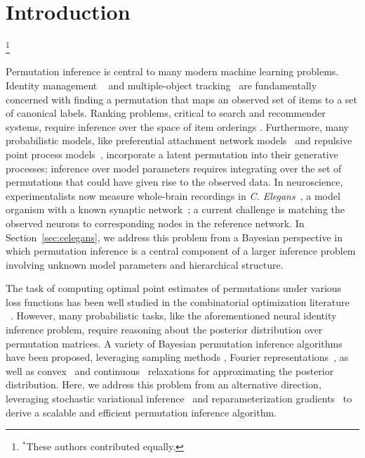 \documentclass[twoside]{article}
\begin{document}
\section{Introduction}
{\let\thefootnote\relax\footnote{$^*$These authors contributed equally.}}

Permutation inference is central to many modern machine learning
problems.  Identity management ~\citep{guibas2008identity} and
multiple-object tracking~\citep{shin2005lazy, kondor2007multi} are
fundamentally concerned with finding a permutation that maps an
observed set of items to a set of canonical labels.  Ranking problems,
critical to search and recommender systems, require inference over the
space of item orderings \citep{meilua2007consensus, lebanon2008non,
  adams2011ranking}.  Furthermore, many probabilistic models, like
preferential attachment network models~\citep{bloem2016random} and
repulsive point process models~\citep{rao2016bayesian}, incorporate a
latent permutation into their generative processes; inference over
model parameters requires integrating over the set of permutations
that could have given rise to the observed data.  In neuroscience,
experimentalists now measure whole-brain recordings in
\textit{C. Elegans}~\citep{Kato2015, nguyen2016whole}, a model
organism with a known synaptic network~\citep{white1986structure}; a
current challenge is matching the observed neurons to corresponding
nodes in the reference network.  In Section~\ref{sec:celegans}, we
address this problem from a Bayesian perspective in which permutation
inference is a central component of a larger inference problem involving
unknown model parameters and hierarchical structure.

The task of computing optimal point estimates of permutations under
various loss functions has been well studied in the combinatorial
optimization literature ~\citep{kuhn1955hungarian,
  munkres1957algorithms, lawler1963quadratic}. However, many
probabilistic tasks, like the aforementioned neural identity inference
problem, require reasoning about the posterior distribution over
permutation matrices.  A variety of Bayesian permutation inference
algorithms have been proposed, leveraging sampling methods
\citep{diaconis1988group, miller2013exact, harrison2013importance},
Fourier representations~\citep{kondor2007multi, huang2009fourier}, as
well as convex~\citep{lim2014beyond} and
continuous~\citep{plis2011directional} relaxations for approximating
the posterior distribution.  Here, we address this problem from an
alternative direction, leveraging stochastic variational
inference~\citep{hoffman2013stochastic} and reparameterization
gradients~\citep{rezende2014stochastic, Kingma2014} to derive a
scalable and efficient permutation inference algorithm.
\end{document}
